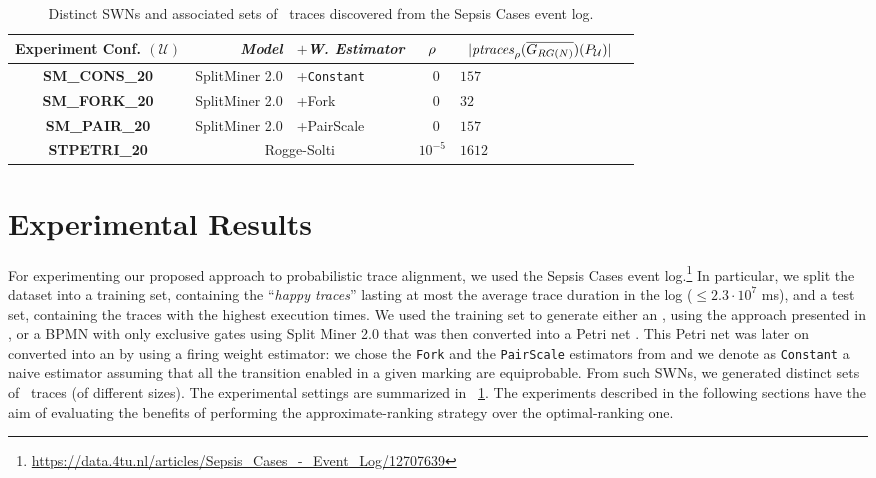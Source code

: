\begin{table}[!t]
\caption{Distinct SWNs and associated sets of \unravelled\ traces discovered from the Sepsis Cases event log.}\label{tab:dataset}
\centering
 \begin{adjustbox}{width=.6\textwidth}
	\begin{tabular}{crl||cl|c}
		\toprule
		\textbf{Experiment Conf.} $(\mathcal{U})$ & \textit{Model} & $+$\textit{W. Estimator} & $\pmin$& $\;\;|\WCal{\pmin}{n}(P_{\mathcal{U}})|$ \\
		\midrule
		
		\textbf{SM\_CONS\_20} &SplitMiner 2.0  \cite{AugustoCDRP19}       & +\texttt{Constant} &  $\;\;0$ & $157$  \\
		
		\textbf{SM\_FORK\_20} & SplitMiner 2.0  \cite{AugustoCDRP19}      & +Fork \cite{spdwe} &  $\;\;0$ & $32$  \\
		
		
		\textbf{SM\_PAIR\_20} & SplitMiner 2.0  \cite{AugustoCDRP19}      & +PairScale \cite{spdwe} &  $\;\;0$ & $157$ \\

		\textbf{STPETRI\_20} & \multicolumn{2}{c||}{Rogge-Solti \cite{RoggeSoltiAW13}} &  $10^{-5}$ & $1612$ \\
		\bottomrule
	\end{tabular}
\end{adjustbox}
\end{table}
\section{Experimental Results}\label{sec:exp}
For experimenting our proposed approach to probabilistic trace alignment, we used the Sepsis Cases event log.\footnote{{\small \url{https://data.4tu.nl/articles/Sepsis_Cases_-_Event_Log/12707639}}} In particular, we
split the dataset into a training set, containing the ``\textit{happy traces}''  lasting at most the average trace duration in the log
($\leq 2.3\cdot 10^{7}$ ms), and a test set, containing the traces with the highest execution times. We used the training set to generate either an \uswn, using the approach presented in \cite{RoggeSoltiAW13}, or a BPMN with only exclusive gates using Split Miner 2.0 \cite{AugustoCDRP19} that was then converted into a Petri net \cite{PPNFromLog}. This Petri net was later on converted into an \uswn by using a firing weight estimator: we chose the \texttt{Fork} and the \texttt{PairScale} estimators from \cite{spdwe} and we denote as \texttt{Constant} a naive estimator assuming that all the transition enabled in a given marking are equiprobable. %
From such SWNs, we generated distinct sets of \unravelled\ traces (of different sizes). The experimental settings are summarized in \tablename~\ref{tab:dataset}. The experiments described in the following sections have the aim of evaluating the benefits of performing the approximate-ranking strategy over the optimal-ranking one.


